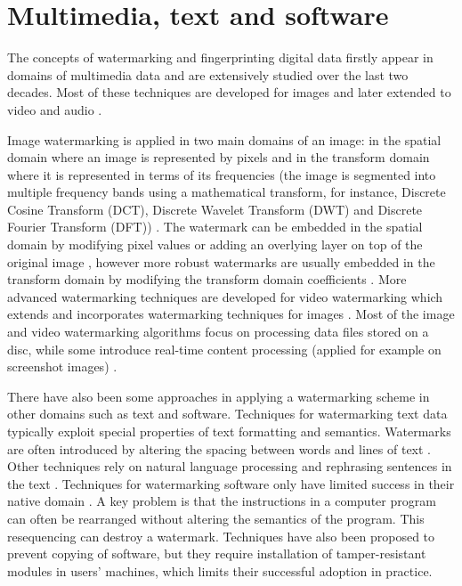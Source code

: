 \section{Multimedia, text and software}
The concepts of watermarking \cite{cox1997secure, petitcolas2000information, lee2001survey} and fingerprinting \cite{wu2004collusion} digital data firstly appear in domains of multimedia data and are extensively studied over the last two decades.
Most of these techniques are developed for images \cite{o1996watermarking} and later extended to video \cite{hartung1998watermarking} and audio \cite{boney1996digital,swanson1998robust}.

Image watermarking is applied in two main domains of an image: in the spatial domain where an image is represented by pixels and in the transform domain where it is represented in terms of its frequencies (the image is segmented into multiple frequency bands using a mathematical transform, for instance, Discrete Cosine Transform (DCT), Discrete Wavelet Transform (DWT) and Discrete Fourier Transform (DFT)) \cite{potdar2005survey}.
The watermark can be embedded in the spatial domain by modifying pixel values \cite{nikolaidis1998robust} or adding an overlying layer on top of the original image \cite{piec2014real}, however more robust watermarks are usually embedded in the transform domain by modifying the transform domain
coefficients \cite{suhail2003digital,solachidis2001circularly}.
More advanced watermarking techniques are developed for video watermarking which extends and incorporates watermarking techniques for images \cite{wolfgang1999perceptual,swanson1998multiresolution}. 
Most of the image and video watermarking algorithms focus on processing data files stored on a disc, while some introduce real-time content processing (applied for example on screenshot images) \cite{piec2014real,kang2006implementation}.

There have also been some approaches in applying a watermarking scheme in other domains such as text and software. 
Techniques for watermarking text data typically exploit
special properties of text formatting and semantics. 
Watermarks are often introduced by altering the spacing
between words and lines of text \cite{maxemchuk1994electronic}. 
Other techniques rely on natural language processing and rephrasing sentences in the text \cite{atallah2001natural, atallah2000natural, atallah1999watermarking, atallah2002natural}.
Techniques for watermarking software only have limited success in their native domain \cite{palsberg2000experience,collberg1999software}.
A key problem is that the instructions in a computer program can often be rearranged without altering the semantics of the program. This resequencing can destroy a watermark. 
Techniques have also been proposed to prevent copying of software, but they require installation of tamper-resistant modules in users’ machines, which limits their successful adoption in practice.

